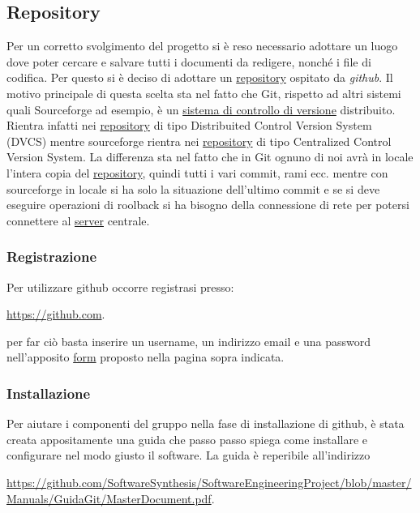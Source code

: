 \subsection{Repository}
\label{sec:repository}
Per un corretto svolgimento del progetto si è reso necessario adottare un luogo dove poter cercare e salvare tutti i documenti da redigere, nonché i file di codifica. Per questo si è deciso di adottare un \underline{repository} ospitato da \textit{github}. Il motivo principale di questa scelta sta nel fatto che Git, rispetto ad altri sistemi quali Sourceforge ad esempio, è un \underline{sistema di controllo di versione} distribuito. Rientra infatti nei \underline{repository} di tipo Distribuited Control Version System (DVCS) mentre sourceforge rientra nei \underline{repository} di tipo Centralized Control Version System. La differenza sta nel fatto che in Git ognuno di noi avrà in locale l'intera copia del \underline{repository}, quindi tutti i vari commit, rami ecc. mentre con sourceforge in locale si ha solo la situazione dell'ultimo commit e se si deve eseguire operazioni di roolback si ha bisogno della connessione di rete per potersi connettere al \underline{server} centrale.

\subsubsection{Registrazione}
Per utilizzare github occorre registrasi presso:
\begin{center}
\url{https://github.com}.
\end{center}
per far ciò basta inserire un username, un indirizzo email e una password nell'apposito \underline{form} proposto nella pagina sopra indicata.

\subsubsection{Installazione}
Per aiutare i componenti del gruppo nella fase di installazione di github, è stata creata appositamente una guida che passo passo spiega come installare e configurare nel modo giusto il software. La guida è reperibile all'indirizzo
\begin{center}
\url{https://github.com/SoftwareSynthesis/SoftwareEngineeringProject/blob/master/Manuals/GuidaGit/MasterDocument.pdf}.
\end{center}

